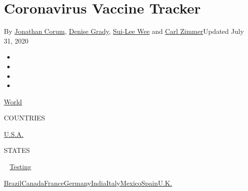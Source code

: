 \hypertarget{coronavirus-vaccine-tracker}{%
\section{Coronavirus Vaccine
Tracker}\label{coronavirus-vaccine-tracker}}

By \href{https://www.nytimes.com/by/jonathan-corum}{Jonathan Corum},
\href{https://www.nytimes.com/by/denise-grady}{Denise Grady},
\href{https://www.nytimes.com/by/sui-lee-wee}{Sui-Lee Wee} and
\href{https://www.nytimes.com/by/carl-zimmer}{Carl Zimmer}Updated July
31, 2020

\begin{itemize}
\item
\item
\item
\item
\end{itemize}

\href{https://www.nytimes.com/interactive/2020/world/coronavirus-maps.html}{World}~

COUNTRIES

\textbar{}
\href{https://www.nytimes.com/interactive/2020/us/coronavirus-us-cases.html}{U.S.A.}~

STATES

~
\href{https://www.nytimes.com/interactive/2020/us/coronavirus-testing.html}{Testing}

\href{https://www.nytimes.com/interactive/2020/world/americas/brazil-coronavirus-cases.html}{Brazil}\href{https://www.nytimes.com/interactive/2020/world/canada/canada-coronavirus-cases.html}{Canada}\href{https://www.nytimes.com/interactive/2020/world/europe/france-coronavirus-cases.html}{France}\href{https://www.nytimes.com/interactive/2020/world/europe/germany-coronavirus-cases.html}{Germany}\href{https://www.nytimes.com/interactive/2020/world/asia/india-coronavirus-cases.html}{India}\href{https://www.nytimes.com/interactive/2020/world/europe/italy-coronavirus-cases.html}{Italy}\href{https://www.nytimes.com/interactive/2020/world/americas/mexico-coronavirus-cases.html}{Mexico}\href{https://www.nytimes.com/interactive/2020/world/europe/spain-coronavirus-cases.html}{Spain}\href{https://www.nytimes.com/interactive/2020/world/europe/united-kingdom-coronavirus-cases.html}{U.K.}

